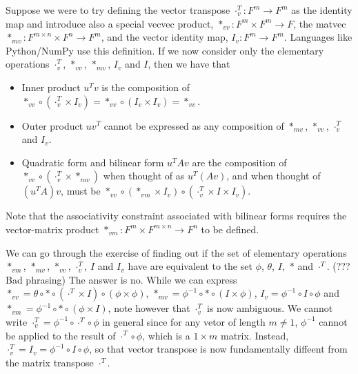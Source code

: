 Suppose we were to try defining the vector transpose $\cdot_{v}^{T}:F^{m}\rightarrow F^{m}$
as the identity map and introduce also a special vecvec product, $*_{vv}:F^{m}\times F^{m}\rightarrow F$,
the matvec $*_{mv}:F^{m\times n}\times F^{n}\rightarrow F^{m}$, and
the vector identity map, $I_{v}:F^{m}\rightarrow F^{m}$. Languages
like Python/NumPy use this definition. If we now consider only the
elementary operations $\cdot_{v}^{T}$, $*_{vv}$, $*_{mv}$, $I_{v}$
and $I$, then we have that
\begin{itemize}
\item Inner product $u^{T}v$ is the composition of $*_{vv}\circ\left(\cdot_{v}^{T}\times I_{v}\right)=*_{vv}\circ\left(I_{v}\times I_{v}\right)=*_{vv}$.
\item Outer product $uv^{T}$ cannot be expressed as any composition of
$*_{mv}$, $*_{vv}$, $\cdot_{v}^{T}$ and $I_{v}$.
\item Quadratic form and bilinear form $u^{T}Av$ are the composition of
$*_{vv}\circ\left(\cdot_{v}^{T}\times*_{mv}\right)$ when thought
of as $u^{T}\left(Av\right)$, and when thought of $\left(u^{T}A\right)v$,
must be $*_{vv}\circ\left(*_{vm}\times I_{v}\right)\circ\left(\cdot_{v}^{T}\times I\times I_{v}\right)$.
\end{itemize}
Note that the associativity constraint associated with bilinear forms
requires the vector-matrix product $*_{vm}:F^{m}\times F^{m\times n}\rightarrow F^{n}$
to be defined.

We can go through the exercise of finding out if the set of elementary
operations $*_{vm}$, $*_{mv}$, $*_{vv}$, $\cdot_{v}^{T}$, $I$
and $I_{v}$ have are equivalent to the set $\phi$, $\theta$, $I,$
$*$ and $\cdot^{T}$. (??? Bad phrasing) The answer is no. While
we can express $*_{vv}=\theta\circ*\circ\left(\cdot^{T}\times I\right)\circ\left(\phi\times\phi\right)$,
$*_{mv}=\phi^{-1}\circ*\circ\left(I\times\phi\right)$, $I_{v}=\phi^{-1}\circ I\circ\phi$
and $*_{vm}=\phi^{-1}\circ*\circ\left(\phi\times I\right)$,  note
however that $\cdot_{v}^{T}$ is now ambiguous. We cannot write $\cdot_{v}^{T}=\phi^{-1}\circ\cdot^{T}\circ\phi$
in general since for any vetor of length $m\ne1$, $\phi^{-1}$ cannot
be applied to the result of $\cdot^{T}\circ\phi$, which is a $1\times m$
matrix. Instead, $\cdot_{v}^{T}=I_{v}=\phi^{-1}\circ I\circ\phi$,
so that vector transpose is now fundamentally diffeent from the matrix
transpose $\cdot^{T}$.


